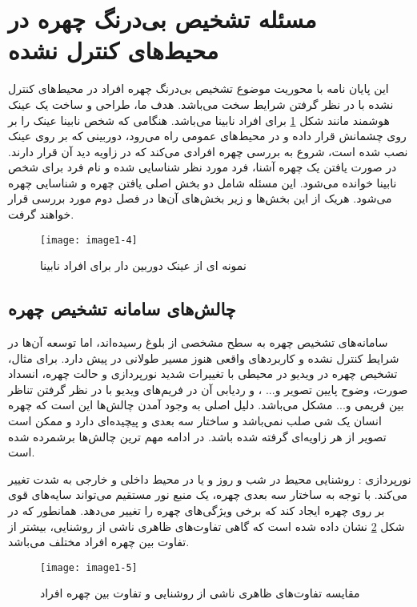 \section{مسئله تشخیص بی‌درنگ چهره در محیط‌های کنترل نشده}
این پایان نامه با محوریت موضوع تشخیص بی‌درنگ چهره افراد در محیط‌های کنترل نشده با در نظر گرفتن شرایط سخت می‌باشد. هدف ما، طراحی و ساخت یک عینک هوشمند مانند شکل \ref{image1-4} برای افراد نابینا می‌باشد. هنگامی که شخص نابینا عینک را بر روی چشمانش قرار داده و در محیط‌های عمومی راه می‌رود، دوربینی که بر روی عینک نصب شده است، شروع به بررسی چهره افرادی می‌کند که در زاویه دید آن قرار دارند. در صورت یافتن یک چهره آشنا، فرد مورد نظر شناسایی شده و نام فرد برای شخص نابینا خوانده می‌شود. این مسئله شامل دو بخش اصلی یافتن چهره و شناسایی چهره می‌شود. هریک از این بخش‌ها و زیر بخش‌های آن‌ها در فصل دوم مورد بررسی قرار خواهند گرفت.

\begin{figure}[!h]
\centering
\texttt{[image: image1-4]}
\caption{نمونه ای از عینک دوربین دار برای افراد نابینا \cite{Glasses}}
\label{image1-4}
\end{figure}

\subsection{چالش‌های سامانه تشخیص چهره}
سامانه‌های تشخیص چهره به سطح مشخصی از بلوغ رسیده‌اند، اما توسعه آن‌ها در شرایط کنترل نشده و کاربردهای واقعی هنوز مسیر طولانی در پیش دارد. برای مثال، تشخیص چهره در ویدیو در محیطی با تغییرات شدید نورپردازی و حالت چهره، انسداد صورت، وضوح پایین تصویر و... ، و ردیابی آن در فریم‌های ویدیو با در نظر گرفتن تناظر بین فریمی و... مشکل می‌باشد. دلیل اصلی به وجود آمدن چالش‌ها این است که چهره انسان یک شی صلب نمی‌باشد و ساختار سه بعدی و پیچیده‌ای دارد و ممکن است تصویر از هر زاویه‌ای گرفته شده باشد. در ادامه مهم ترین چالش‌ها برشمرده شده است.

\noindent
نورپردازی : روشنایی محیط در شب و روز و یا در محیط داخلی و خارجی به شدت تغییر می‌کند. با توجه به ساختار سه بعدی چهره، یک منبع نور مستقیم می‌تواند سایه‌های قوی بر روی چهره ایجاد کند که برخی ویژگی‌های چهره را تغییر می‌دهد. همانطور که در شکل \ref{image1-5} نشان داده شده است که گاهی تفاوت‌های ظاهری ناشی از روشنایی، بیشتر از تفاوت بین چهره افراد مختلف می‌باشد.

\begin{figure}[!h]
\centering
\texttt{[image: image1-5]}
\caption{مقایسه تفاوت‌های ظاهری ناشی از روشنایی و تفاوت بین چهره افراد \cite{6196234}}
\label{image1-5}
\end{figure}

